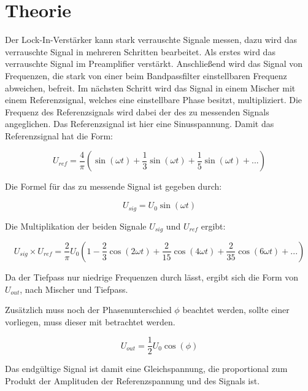 \section{Theorie}
Der Lock-In-Verstärker kann stark verrauschte Signale messen, dazu wird das verrauschte Signal in mehreren Schritten bearbeitet. Als erstes wird das verrauschte Signal im Preamplifier verstärkt. Anschließend wird das Signal von Frequenzen, die stark von einer beim Bandpassfilter einstellbaren Frequenz abweichen, befreit.
Im nächsten Schritt wird das Signal in einem Mischer mit einem
Referenzsignal, welches eine einstellbare Phase besitzt, multipliziert. Die Frequenz des Referenzsignals wird dabei der des zu messenden Signals angeglichen. Das Referenzsignal ist hier eine Sinusspannung. 
Damit das Referenzsignal hat die Form:

\begin{equation}
  \label{eq:ref}
  U_{ref} = \frac{4}{\pi} \left( \sin(\omega t) + \frac{1}{3} \sin(\omega t) + \frac{1}{5} \sin(\omega t) + ... \right)
\end{equation}

Die Formel für das zu messende Signal ist gegeben durch:

\begin{equation}
  \label{eq:sig}
  U_{sig} = U_{0} \sin(\omega t)
\end{equation}

Die Multiplikation der beiden Signale $U_{sig}$ und $U_{ref}$ ergibt:

\begin{equation*}
  U_{sig} \times U_{ref} = \frac{2}{\pi} U_{0} \left(1 - \frac{2}{3} \cos(2\omega t) + \frac{2}{15} \cos(4\omega t) + \frac{2}{35} \cos(6\omega t) + ... \right)
\end{equation*}

Da der Tiefpass nur niedrige Frequenzen durch lässt, ergibt sich die Form von $U_{out}$, nach Mischer und Tiefpass.

Zusätzlich muss noch der Phasenunterschied $\phi$ beachtet werden, sollte einer vorliegen, muss dieser mit betrachtet werden.

\begin{equation}
  \label{eq:out}
   U_{out} = \frac{1}{2} U_{0} \cos(\phi)
\end{equation}

Das endgültige Signal ist damit eine Gleichspannung, die proportional zum
Produkt der Amplituden der Referenzspannung und des Signals ist.
